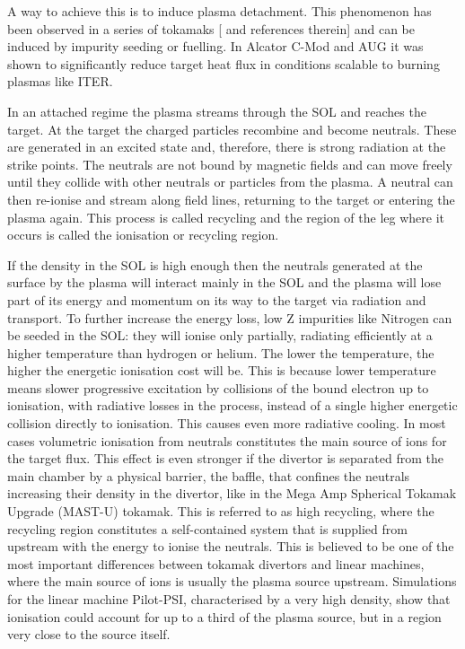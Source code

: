 A way to achieve this is to induce plasma detachment. This phenomenon has been observed in a series of tokamaks [\cite{Reimold2015} and references therein] and can be induced by impurity seeding or fuelling. In Alcator C-Mod \cite{Lipschultz2007} and AUG \cite{Kallenbach2015a} it was shown to significantly reduce target heat flux in conditions scalable to burning plasmas like ITER.

In an attached regime the plasma streams through the SOL and reaches the target. At the target the charged particles recombine and become neutrals. These are generated in an excited state and, therefore, there is strong radiation at the strike points. The neutrals are not bound by magnetic fields and can move freely until they collide with other neutrals or particles from the plasma. A neutral can then re-ionise and stream along field lines, returning to the target or entering the plasma again. This process is called recycling and the region of the leg where it occurs is called the ionisation or recycling region.

If the density in the SOL is high enough then the neutrals generated at the surface by the plasma will interact mainly in the SOL and the plasma will lose part of its energy and momentum on its way to the target via radiation and transport.\cite{Leonard2018} To further increase the energy loss, low Z impurities like Nitrogen can be seeded in the SOL: they will ionise only partially, radiating efficiently at a higher temperature than hydrogen or helium. The lower the temperature, the higher the energetic ionisation cost will be. This is because lower temperature means slower progressive excitation by collisions of the bound electron up to ionisation, with radiative losses in the process, instead of a single higher energetic collision directly to ionisation. This causes even more radiative cooling. In most cases volumetric ionisation from neutrals constitutes the main source of ions for the target flux. This effect is even stronger if the divertor is separated from the main chamber by a physical barrier, the baffle, that confines the neutrals increasing their density in the divertor, like in the Mega Amp Spherical Tokamak Upgrade (MAST-U) tokamak. \cite{Krasheninnikov2016,Krasheninnikov2017a,Lipschultz1999} This is referred to as high recycling, where the recycling region constitutes a self-contained system that is supplied from upstream with the energy to ionise the neutrals. This is believed to be one of the most important differences between tokamak divertors and linear machines, where the main source of ions is usually the plasma source upstream. Simulations for the linear machine Pilot-PSI, characterised by a very high density, show that ionisation could account for up to a third of the plasma source, but in a region very close to the source itself.\cite{Jesko2018,Hayashi2016}

